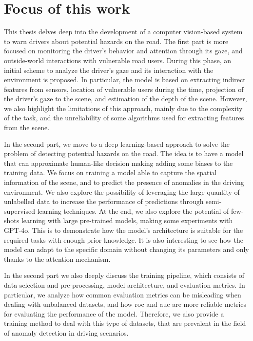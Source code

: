 \section{Focus of this work}
\label{sec:focus}
This thesis delves deep into the development of a computer vision-based system 
to warn drivers about potential hazards on the road. The first part is more 
focused on monitoring the driver's behavior and attention through its gaze, and 
outside-world interactions with vulnerable road users. During this phase, 
an initial scheme to analyze the driver's gaze and its interaction with the 
environment is proposed. In particular, the model is based on extracting indirect 
features from sensors, location of vulnerable users during the time, projection 
of the driver's gaze to the scene, and estimation of the depth of the scene.
However, we also highlight the limitations of this approach, mainly due to the 
complexity of the task, and the unreliability of some algorithms used for 
extracting features from the scene.

In the second part, we move to a deep learning-based approach to solve the 
problem of detecting potential hazards on the road. The idea is to have a model 
that can approximate human-like decision making adding some biases to the 
training data.
We focus on training a model 
able to capture the spatial information of the scene, and to predict the presence 
of anomalies in the driving environment. We also explore the possibility of 
leveraging the large quantity of unlabelled data to increase the performance 
of predictions through semi-supervised learning techniques.
At the end, we also explore the potential of few-shots learning with large 
pre-trained models, making some experiments with GPT-4o. This is to demonstrate 
how the model's architecture is suitable for the required tasks with enough 
prior knowledge. It is also interesting to see how the model can adapt to 
the specific domain without changing its parameters and only thanks to the 
attention mechanism.

In the second part we also deeply discuss the training pipeline, which consists 
of data selection and pre-processing, model architecture, and evaluation metrics.
In particular, we analyze how common evaluation metrics can be misleading 
when dealing with unbalanced datasets, and how \ac{roc} and \ac{auc} are 
more reliable metrics for evaluating the performance of the model.
Therefore, we also provide a training method to deal with this type of datasets,
that are prevalent in the field of anomaly detection in driving scenarios.

